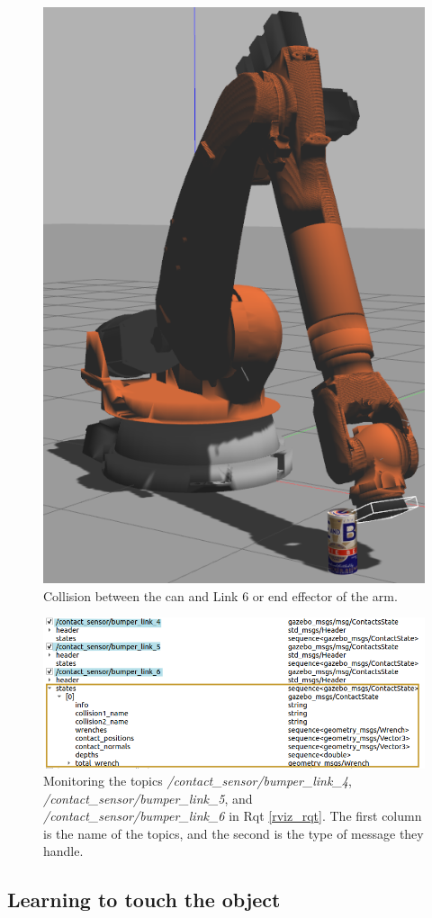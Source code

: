\documentclass[12pt,oneside]{article}
\begin{document}
\begin{figure}[H]
\centering
\includegraphics[width=0.4\linewidth]{link_6_collision}
\caption{Collision between the can and Link 6 or end effector of the arm.}
\label{fig:link6collision}
\end{figure}
\begin{figure}[H]
\centering
\includegraphics[width=0.9\linewidth]{rqt_link_6_collision}
\caption[Contact sensors monitoring with Rqt.]{Monitoring the topics \textit{/contact\_sensor/bumper\_link\_4}, \\ \textit{ /contact\_sensor/bumper\_link\_5}, and \textit{/contact\_sensor/bumper\_link\_6} in Rqt \ref{rviz_rqt}. The first column is the name of the topics, and the second is the type of message they handle. }
\label{fig:rqtlink6collision}
\end{figure}

\subsection{Learning to touch the object}\label{experiment:learning-touch-object}
\end{document}
